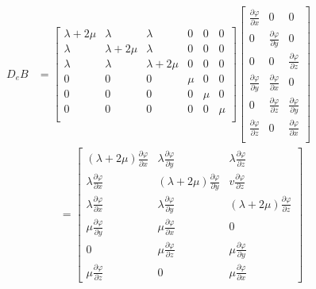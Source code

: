 \documentclass[12pt]{article}
\begin{document}
%
\begin{equation}	\label{eq47}
\begin{split}
D_eB& = \left[
\begin{array}{cccccc}
\lambda+2\mu & \lambda & \lambda & 0 & 0 & 0 			\\
\lambda & \lambda+2\mu & \lambda & 0 & 0 & 0 			\\
\lambda & \lambda & \lambda+2\mu & 0 & 0 & 0 			\\
0 & 0 & 0 & \mu & 0 & 0 			\\
0 & 0 & 0 & 0 &  \mu & 0 			\\
0 & 0 & 0 & 0 & 0 &  \mu 			\\
\end{array}
\right]
%
\left[
\begin{array}{ccc}
\frac{\partial \varphi}{\partial x} & 0 & 0  			\\
0 &\frac{\partial \varphi}{\partial y} & 0  				\\
0 & 0 &\frac{\partial \varphi}{\partial z} 				\\
\frac{\partial \varphi}{\partial y} & \frac{\partial \varphi}{\partial x} & 0  			\\
0 & \frac{\partial \varphi}{\partial z} & \frac{\partial \varphi}{\partial y}  			\\
\frac{\partial \varphi}{\partial z} & 0 & \frac{\partial \varphi}{\partial x}  			\\
\end{array}
\right]	\\
%
& \qquad=
\left[
\begin{array}{ccc}
(\lambda+2\mu)\frac{\partial \varphi}{\partial x} & \lambda\frac{\partial \varphi}{\partial y} & \lambda\frac{\partial \varphi}{\partial z}  			\\
\lambda\frac{\partial \varphi}{\partial x} &(\lambda+2\mu)\frac{\partial \varphi}{\partial y} & v\frac{\partial \varphi}{\partial z}  				\\
\lambda\frac{\partial \varphi}{\partial x} & \lambda\frac{\partial \varphi}{\partial y} &(\lambda+2\mu)\frac{\partial \varphi}{\partial z}				\\
\mu\frac{\partial \varphi}{\partial y} & \mu\frac{\partial \varphi}{\partial x} & 0  			\\
0 & \mu\frac{\partial \varphi}{\partial z} & \mu\frac{\partial \varphi}{\partial y}  			\\
\mu\frac{\partial \varphi}{\partial z} & 0 & \mu\frac{\partial \varphi}{\partial x} 
\end{array}
\right]
\end{split}
\end{equation}
\end{document}
